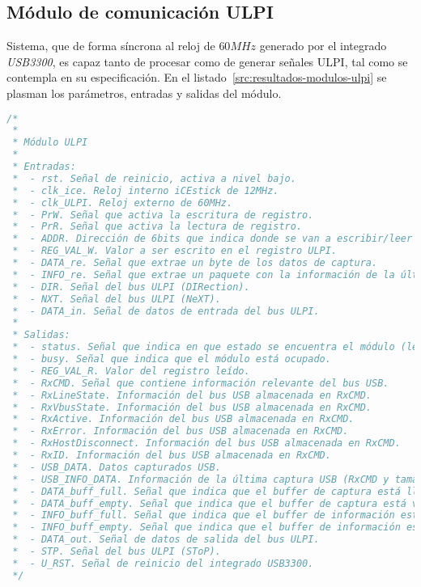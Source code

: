 \subsection{Módulo de comunicación ULPI}
Sistema, que de forma síncrona al reloj de $60MHz$ generado por el integrado \emph{USB3300}, es capaz tanto de procesar como de generar señales ULPI, tal como se contempla en su especificación\cite{ulpi-specs}. En el listado~\ref{src:resultados-modulos-ulpi} se plasman los parámetros, entradas y salidas del módulo.

\begin{lstlisting}[language=Verilog,
    caption={Entradas y salidas del módulo ULPI.},
    label=src:resultados-modulos-ulpi]
/*
 *
 * Módulo ULPI
 *
 * Entradas:
 *  - rst. Señal de reinicio, activa a nivel bajo.
 *  - clk_ice. Reloj interno iCEstick de 12MHz.
 *  - clk_ULPI. Reloj externo de 60MHz.
 *  - PrW. Señal que activa la escritura de registro.
 *  - PrR. Señal que activa la lectura de registro.
 *  - ADDR. Dirección de 6bits que indica donde se van a escribir/leer los datos.
 *  - REG_VAL_W. Valor a ser escrito en el registro ULPI.
 *  - DATA_re. Señal que extrae un byte de los datos de captura.
 *  - INFO_re. Señal que extrae un paquete con la información de la última captura.
 *  - DIR. Señal del bus ULPI (DIRection).
 *  - NXT. Señal del bus ULPI (NeXT).
 *  - DATA_in. Señal de datos de entrada del bus ULPI.
 *
 * Salidas:
 *  - status. Señal que indica en que estado se encuentra el módulo (lectura, escritura, etc..)
 *  - busy. Señal que indica que el módulo está ocupado.
 *  - REG_VAL_R. Valor del registro leído.
 *  - RxCMD. Señal que contiene información relevante del bus USB.
 *  - RxLineState. Información del bus USB almacenada en RxCMD.
 *  - RxVbusState. Información del bus USB almacenada en RxCMD.
 *  - RxActive. Información del bus USB almacenada en RxCMD.
 *  - RxError. Información del bus USB almacenada en RxCMD.
 *  - RxHostDisconnect. Información del bus USB almacenada en RxCMD.
 *  - RxID. Información del bus USB almacenada en RxCMD.
 *  - USB_DATA. Datos capturados USB.
 *  - USB_INFO_DATA. Información de la última captura USB (RxCMD y tamaño).
 *  - DATA_buff_full. Señal que indica que el buffer de captura está lleno.
 *  - DATA_buff_empty. Señal que indica que el buffer de captura está vacio.
 *  - INFO_buff_full. Señal que indica que el buffer de información está lleno.
 *  - INFO_buff_empty. Señal que indica que el buffer de información está vacio.
 *  - DATA_out. Señal de datos de salida del bus ULPI.
 *  - STP. Señal del bus ULPI (SToP).
 *  - U_RST. Señal de reinicio del integrado USB3300.
 */
\end{lstlisting}

